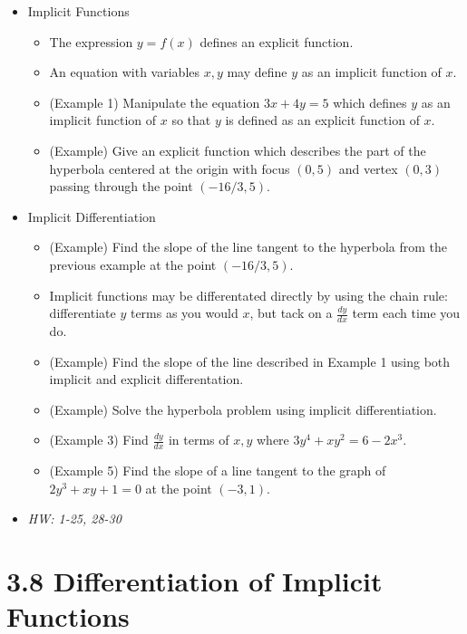 \documentclass[11pt]{article}
\begin{document}
\begin{itemize}
\item Implicit Functions
  \begin{itemize}
    \item The expression \(y=f(x)\) defines an explicit function.
    \item An equation with variables \(x,y\) may define \(y\) as an
          implicit function of \(x\).
    \item (Example 1) Manipulate the equation \(3x+4y=5\) which defines
          \(y\) as an implicit function of \(x\) so that \(y\) is defined
          as an explicit function of \(x\).
    \item (Example) Give an explicit function which describes the part of
          the hyperbola centered at the origin
          with focus \((0,5)\) and vertex \((0,3)\) passing through
          the point \((-16/3,5)\).
  \end{itemize}
\item Implicit Differentiation
  \begin{itemize}
    \item (Example) Find the slope of the line tangent to the hyperbola
          from the previous example at the point \((-16/3,5)\).
    \item Implicit functions may be differentated directly by using the
          chain rule: differentiate \(y\) terms as you would \(x\), but
          tack on a \(\frac{dy}{dx}\) term each time you do.
    \item (Example) Find the slope of the line described in Example 1 using both
          implicit and explicit differentation.
    \item (Example) Solve the hyperbola problem using implicit differentiation.
    \item (Example 3) Find \(\frac{dy}{dx}\) in terms of \(x,y\) where
          \(3y^4+xy^2=6-2x^3\).
    \item (Example 5) Find the slope of a line tangent to the graph of
          \(2y^3+xy+1=0\) at the point \((-3,1)\).
  \end{itemize}
\item\textit{
  HW: 1-25, 28-30
}
\end{itemize}

\section*{3.8 Differentiation of Implicit Functions}
\end{document}
